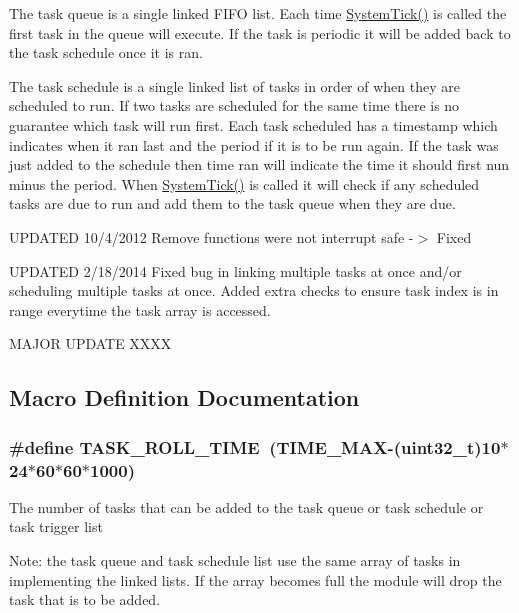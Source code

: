 The task queue is a single linked F\+I\+F\+O list. Each time \hyperlink{group__task_gafd2aa563748d1ede229e5867753ead5d}{System\+Tick()} is called the first task in the queue will execute. If the task is periodic it will be added back to the task schedule once it is ran.

The task schedule is a single linked list of tasks in order of when they are scheduled to run. If two tasks are scheduled for the same time there is no guarantee which task will run first. Each task scheduled has a timestamp which indicates when it ran last and the period if it is to be run again. If the task was just added to the schedule then time ran will indicate the time it should first nun minus the period. When \hyperlink{group__task_gafd2aa563748d1ede229e5867753ead5d}{System\+Tick()} is called it will check if any scheduled tasks are due to run and add them to the task queue when they are due.

U\+P\+D\+A\+T\+E\+D 10/4/2012 Remove functions were not interrupt safe -\/$>$ Fixed

U\+P\+D\+A\+T\+E\+D 2/18/2014 Fixed bug in linking multiple tasks at once and/or scheduling multiple tasks at once. Added extra checks to ensure task index is in range everytime the task array is accessed.

M\+A\+J\+O\+R U\+P\+D\+A\+T\+E X\+X\+X\+X 

\subsection{Macro Definition Documentation}
\hypertarget{group__task_ga63e7ac0b07d5527e8110261f64661128}{}
\subsubsection[{T\+A\+S\+K\+\_\+\+R\+O\+L\+L\+\_\+\+T\+I\+M\+E}]{\setlength{\rightskip}{0pt plus 5cm}\#define T\+A\+S\+K\+\_\+\+R\+O\+L\+L\+\_\+\+T\+I\+M\+E~({\bf T\+I\+M\+E\+\_\+\+M\+A\+X}-\/(uint32\+\_\+t)10$\ast$24$\ast$60$\ast$60$\ast$1000)}\label{group__task_ga63e7ac0b07d5527e8110261f64661128}
The number of tasks that can be added to the task queue or task schedule or task trigger list

Note\+: the task queue and task schedule list use the same array of tasks in implementing the linked lists. If the array becomes full the module will drop the task that is to be added.

